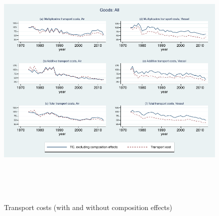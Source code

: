 \documentclass[a4paper,11pt]{article}
\begin{document}
\begin{figure}[htbp]
\caption{Transport costs (with and without composition effects)}
\label{fig:totalTC_compeffects_excl}
\begin{center}
\includegraphics[height=5in]
{graph_composition_all.pdf}
\end{center}
\end{figure}
\end{document}
